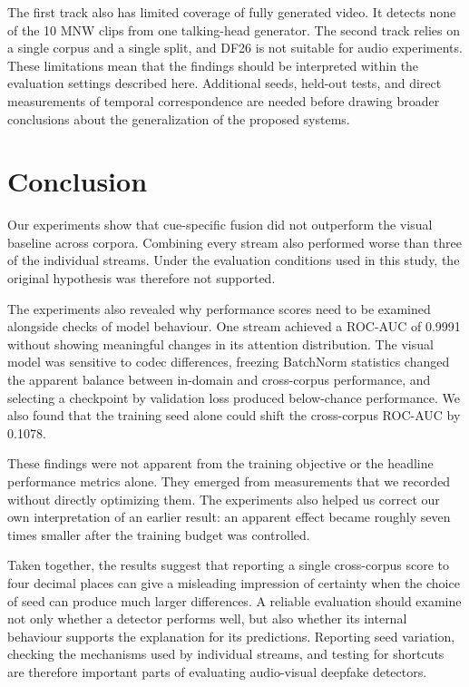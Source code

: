 \documentclass[conference]{IEEEtran}
\begin{document}
The first track also has limited coverage of fully generated video. It
detects none of the 10 MNW clips from one talking-head generator. The second
track relies on a single corpus and a single split, and DF26 is not suitable
for audio experiments. These limitations mean that the findings should be
interpreted within the evaluation settings described here. Additional seeds,
held-out tests, and direct measurements of temporal correspondence are needed
before drawing broader conclusions about the generalization of the proposed
systems.

\section{Conclusion}

Our experiments show that cue-specific fusion did not outperform the visual
baseline across corpora. Combining every stream also performed worse than
three of the individual streams. Under the evaluation conditions used in this
study, the original hypothesis was therefore not supported.

The experiments also revealed why performance scores need to be examined
alongside checks of model behaviour. One stream achieved a ROC-AUC of 0.9991
without showing meaningful changes in its attention distribution. The visual
model was sensitive to codec differences, freezing BatchNorm statistics
changed the apparent balance between in-domain and cross-corpus performance,
and selecting a checkpoint by validation loss produced below-chance
performance. We also found that the training seed alone could shift the
cross-corpus ROC-AUC by 0.1078.

These findings were not apparent from the training objective or the headline
performance metrics alone. They emerged from measurements that we recorded
without directly optimizing them. The experiments also helped us correct our
own interpretation of an earlier result: an apparent effect became roughly
seven times smaller after the training budget was controlled.

Taken together, the results suggest that reporting a single cross-corpus
score to four decimal places can give a misleading impression of certainty
when the choice of seed can produce much larger differences. A reliable
evaluation should examine not only whether a detector performs well, but
also whether its internal behaviour supports the explanation for its
predictions. Reporting seed variation, checking the mechanisms used by
individual streams, and testing for shortcuts are therefore important parts
of evaluating audio-visual deepfake detectors.
\end{document}
